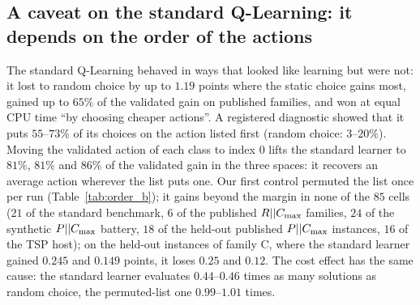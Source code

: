 \subsection{A caveat on the standard Q-Learning: it depends on the order of the actions}
\label{sec:order}
The standard Q-Learning behaved in ways that looked like learning but were not: it lost to random choice by up to $1.19$ points where the static choice gains most, gained up to $65\%$ of the validated gain on published families, and won at equal CPU time ``by choosing cheaper actions''. A registered diagnostic showed that it puts $55$--$73\%$ of its choices on the action listed first (random choice: $3$--$20\%$). Moving the validated action of each class to index $0$ lifts the standard learner to $81\%$, $81\%$ and $86\%$ of the validated gain in the three spaces: it recovers an average action wherever the list puts one. Our first control permuted the list once per run (Table~\ref{tab:order_b}); it gains beyond the margin in none of the $85$ cells ($21$ of the standard benchmark, $6$ of the published $R||C_{\max}$ families, $24$ of the synthetic $P||C_{\max}$ battery, $18$ of the held-out published $P||C_{\max}$ instances, $16$ of the TSP host); on the held-out instances of family C, where the standard learner gained $0.245$ and $0.149$ points, it loses $0.25$ and $0.12$. The cost effect has the same cause: the standard learner evaluates $0.44$--$0.46$ times as many solutions as random choice, the permuted-list one $0.99$--$1.01$ times.



